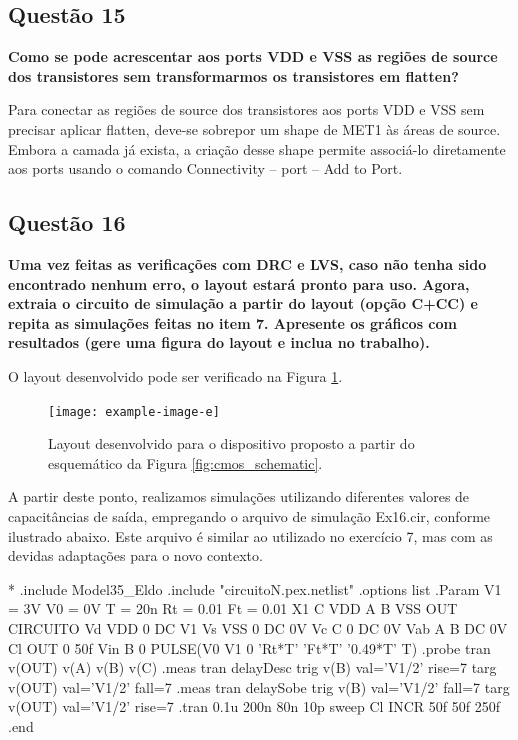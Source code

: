 ﻿\documentclass[12pt,a4paper]{article}
\begin{document}
\subsection*{Questão 15}

	\textbf{Como se pode acrescentar aos ports VDD e VSS as regiões de source dos transistores sem transformarmos os transistores em flatten?}

Para conectar as regiões de source dos transistores aos ports VDD e VSS sem precisar aplicar flatten, deve-se sobrepor um shape de MET1 às áreas de source. Embora a camada já exista, a criação desse shape permite associá-lo diretamente aos ports usando o comando Connectivity -- port -- Add to Port.

\subsection*{Questão 16}

	\textbf{Uma vez feitas as verificações com DRC e LVS, caso não tenha sido encontrado nenhum erro, o layout estará pronto para uso. Agora, extraia o circuito de simulação a partir do layout (opção C+CC) e repita as simulações feitas no item 7. Apresente os gráficos com resultados (gere uma figura do layout e inclua no trabalho).}

O layout desenvolvido pode ser verificado na Figura \ref{fig:layout_developed}.

\begin{figure}[H]
    \centering
    \texttt{[image: example-image-e]}
    \caption{Layout desenvolvido para o dispositivo proposto a partir do esquemático da Figura \ref{fig:cmos_schematic}.}
    \label{fig:layout_developed}
\end{figure}

A partir deste ponto, realizamos simulações utilizando diferentes valores de capacitâncias de saída, empregando o arquivo de simulação Ex16.cir, conforme ilustrado abaixo. Este arquivo é similar ao utilizado no exercício 7, mas com as devidas adaptações para o novo contexto.

\begin{codeblock}[title={Exemplo de Simulação}, label={lst:simulation_example}, listing options={language=TeX}]
*
.include Model35_Eldo
.include "circuitoN.pex.netlist"
.options list
.Param V1 = 3V V0 = 0V T = 20n Rt = 0.01 Ft = 0.01
X1 C VDD A B VSS OUT CIRCUITO
Vd VDD 0 DC V1
Vs VSS 0 DC 0V
Vc C 0 DC 0V
Vab A B DC 0V
Cl OUT 0 50f
Vin B 0 PULSE(V0 V1 0 'Rt*T' 'Ft*T' '0.49*T' T)
.probe tran v(OUT) v(A) v(B) v(C)
.meas tran delayDesc trig v(B) val='V1/2' rise=7 targ v(OUT) val='V1/2'
fall=7
.meas tran delaySobe trig v(B) val='V1/2' fall=7 targ v(OUT) val='V1/2'
rise=7
.tran 0.1u 200n 80n 10p sweep Cl INCR 50f 50f 250f
.end
\end{codeblock}
\end{document}
